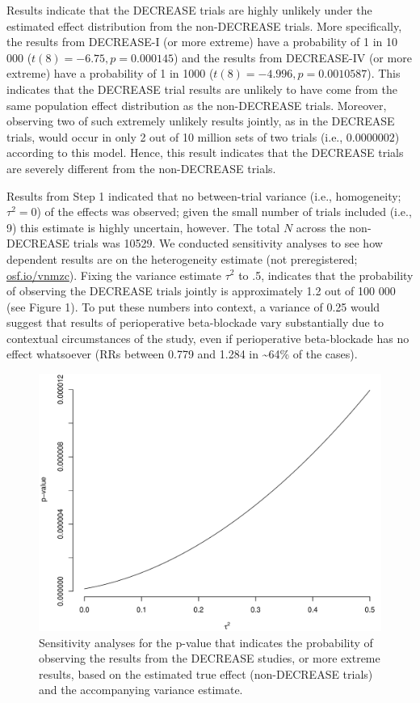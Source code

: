 \documentclass[]{article}
\begin{document}
Results indicate that the DECREASE trials are highly unlikely under the
estimated effect distribution from the non-DECREASE trials. More
specifically, the results from DECREASE-I (or more extreme) have a
probability of 1 in 10 000 (\(t(8)=-6.75,p=0.000145\)) and the results
from DECREASE-IV (or more extreme) have a probability of 1 in 1000
(\(t(8)=-4.996,p=0.0010587\)). This indicates that the DECREASE trial
results are unlikely to have come from the same population effect
distribution as the non-DECREASE trials. Moreover, observing two of such
extremely unlikely results jointly, as in the DECREASE trials, would
occur in only 2 out of 10 million sets of two trials (i.e.,
\(0.0000002\)) according to this model. Hence, this result indicates
that the DECREASE trials are severely different from the non-DECREASE
trials.

Results from Step 1 indicated that no between-trial variance (i.e.,
homogeneity; \(\tau^2=0\)) of the effects was observed; given the small
number of trials included (i.e., 9) this estimate is highly uncertain,
however. The total \(N\) across the non-DECREASE trials was 10529. We
conducted sensitivity analyses to see how dependent results are on the
heterogeneity estimate (not preregistered;
\href{https://osf.io/vnmzc}{osf.io/vnmzc}). Fixing the variance estimate
\(\tau^2\) to .5, indicates that the probability of observing the
DECREASE trials jointly is approximately 1.2 out of 100 000 (see Figure
1). To put these numbers into context, a variance of 0.25 would suggest
that results of perioperative beta-blockade vary substantially due to
contextual circumstances of the study, even if perioperative
beta-blockade has no effect whatsoever (RRs between 0.779 and 1.284 in
\textasciitilde{}64\% of the cases).

\begin{figure}

{\centering \includegraphics[width=0.8\linewidth]{../figures/fig2} 

}

\caption{Sensitivity analyses for the p-value that indicates the probability of observing the results from the DECREASE studies, or more extreme results, based on the estimated true effect (non-DECREASE trials) and the accompanying variance estimate.}\label{fig:figure 2}
\end{figure}
\end{document}
